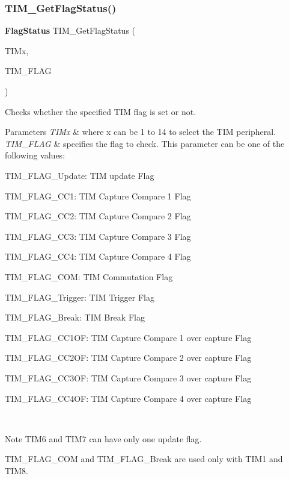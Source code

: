 \subsubsection{T\+I\+M\+\_\+\+Get\+Flag\+Status()}
{\footnotesize\ttfamily \textbf{ Flag\+Status} T\+I\+M\+\_\+\+Get\+Flag\+Status (\begin{DoxyParamCaption}\item[{\textbf{ T\+I\+M\+\_\+\+Type\+Def} $\ast$}]{T\+I\+Mx,  }\item[{uint16\+\_\+t}]{T\+I\+M\+\_\+\+F\+L\+AG }\end{DoxyParamCaption})}



Checks whether the specified T\+IM flag is set or not. 


\begin{DoxyParams}{Parameters}
{\em T\+I\+Mx} & where x can be 1 to 14 to select the T\+IM peripheral. \\
\hline
{\em T\+I\+M\+\_\+\+F\+L\+AG} & specifies the flag to check. This parameter can be one of the following values\+: \begin{DoxyItemize}
\item T\+I\+M\+\_\+\+F\+L\+A\+G\+\_\+\+Update\+: T\+IM update Flag \item T\+I\+M\+\_\+\+F\+L\+A\+G\+\_\+\+C\+C1\+: T\+IM Capture Compare 1 Flag \item T\+I\+M\+\_\+\+F\+L\+A\+G\+\_\+\+C\+C2\+: T\+IM Capture Compare 2 Flag \item T\+I\+M\+\_\+\+F\+L\+A\+G\+\_\+\+C\+C3\+: T\+IM Capture Compare 3 Flag \item T\+I\+M\+\_\+\+F\+L\+A\+G\+\_\+\+C\+C4\+: T\+IM Capture Compare 4 Flag \item T\+I\+M\+\_\+\+F\+L\+A\+G\+\_\+\+C\+OM\+: T\+IM Commutation Flag \item T\+I\+M\+\_\+\+F\+L\+A\+G\+\_\+\+Trigger\+: T\+IM Trigger Flag \item T\+I\+M\+\_\+\+F\+L\+A\+G\+\_\+\+Break\+: T\+IM Break Flag \item T\+I\+M\+\_\+\+F\+L\+A\+G\+\_\+\+C\+C1\+OF\+: T\+IM Capture Compare 1 over capture Flag \item T\+I\+M\+\_\+\+F\+L\+A\+G\+\_\+\+C\+C2\+OF\+: T\+IM Capture Compare 2 over capture Flag \item T\+I\+M\+\_\+\+F\+L\+A\+G\+\_\+\+C\+C3\+OF\+: T\+IM Capture Compare 3 over capture Flag \item T\+I\+M\+\_\+\+F\+L\+A\+G\+\_\+\+C\+C4\+OF\+: T\+IM Capture Compare 4 over capture Flag\end{DoxyItemize}
\\
\hline
\end{DoxyParams}
\begin{DoxyNote}{Note}
T\+I\+M6 and T\+I\+M7 can have only one update flag. 

T\+I\+M\+\_\+\+F\+L\+A\+G\+\_\+\+C\+OM and T\+I\+M\+\_\+\+F\+L\+A\+G\+\_\+\+Break are used only with T\+I\+M1 and T\+I\+M8.
\end{DoxyNote}

